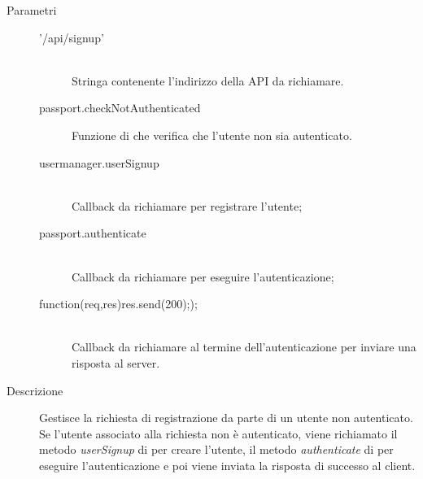\begin{description}
\begin{description}
\begin{mldescription}
 \begin{description}
    \item[Parametri] \hfill
     \begin{description}
      \item['/api/signup'] \hfill \\
      Stringa contenente l'indirizzo della API da richiamare.
      \item[passport.checkNotAuthenticated]
      Funzione di  che verifica che l'utente non sia autenticato.
      \item[usermanager.userSignup] \hfill \\
      Callback da richiamare per registrare l'utente;
      \item[passport.authenticate] \hfill \\
      Callback da richiamare per eseguire l'autenticazione;
      \item[function(req,res){res.send(200););}] \hfill \\
      Callback da richiamare al termine dell'autenticazione per inviare una risposta al server.
     \end{description}
    \item[Descrizione]
    Gestisce la richiesta di registrazione da parte di un utente non autenticato. Se l'utente associato alla richiesta non è autenticato, viene richiamato il metodo \textit{userSignup} di  per creare l'utente, il metodo \textit{authenticate} di  per eseguire l'autenticazione e poi viene inviata la risposta di successo al client.
 \end{description}
 

\end{mldescription}
\end{description}
\end{description}
